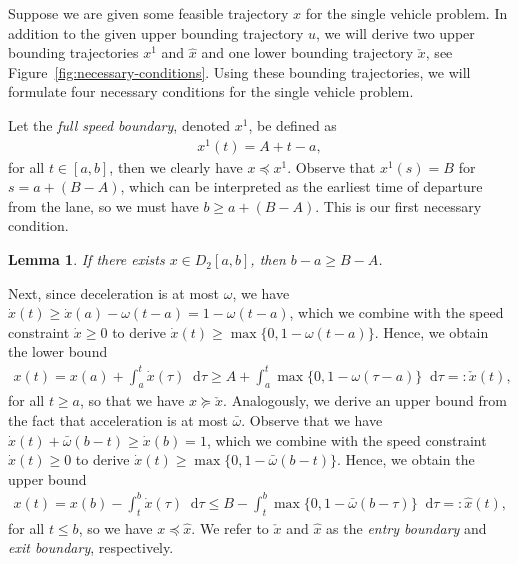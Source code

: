 \documentclass[a4paper]{report}
\theoremstyle{definition}
\theoremstyle{plain}
\newtheorem{lemma}{Lemma}[chapter]
\newcommand*\diff{\mathop{}\!\mathrm{d}}
\begin{document}
Suppose we are given some feasible trajectory $x$ for the single vehicle
problem.
%
In addition to the given upper bounding trajectory $u$, we will derive two
upper bounding trajectories $x^{1}$ and $\hat{x}$ and one lower bounding
trajectory $\check{x}$, see Figure~\ref{fig:necessary-conditions}.
%
Using these bounding trajectories, we will formulate four necessary conditions
for the single vehicle problem.

Let the \emph{full speed boundary}, denoted $x^{1}$, be defined as
\begin{align}
  x^{1}(t) = A + t - a,
\end{align}
for all $t \in [a, b]$, then we clearly have $x \preceq x^{1}$. Observe that
$x^{1}(s) = B$ for $s = a + (B-A)$, which can be interpreted as the earliest
time of departure from the lane, so we must have $b \geq a + (B-A)$. This is our
first necessary condition.
%
\begin{lemma}\label{lemma:travel-constraint}
  If there exists $x\in D_{2}[a,b]$, then $b-a \geq B-A$.
\end{lemma}

Next, since deceleration is at most $\omega$, we have
$\dot{x}(t) \geq \dot{x}(a) - \omega(t - a) = 1 - \omega(t - a)$, which we
combine with the speed constraint $\dot{x} \geq 0$ to derive
$\dot{x}(t) \geq \max\{0, 1 - \omega (t - a) \}$. Hence, we obtain the lower
bound
\begin{align}\label{eq:check-x}
  x(t) = x(a) + \int_{a}^{t} \dot{x}(\tau) \diff \tau \geq A + \int_{a}^{t} \max\{0, 1 - \omega (\tau - a) \} \diff \tau =: \check{x}(t) ,
\end{align}
for all $t \geq a$, so that we have $x \succeq \check{x}$.
%
Analogously, we derive an upper bound from the fact that acceleration is at most $\bar{\omega}$. Observe that we have
$\dot{x}(t) + \bar{\omega} (b - t) \geq \dot{x}(b) = 1$, which we combine
with the speed constraint $\dot{x}(t) \geq 0$ to derive
$\dot{x}(t) \geq \max \{ 0, 1 - \bar{\omega}(b - t) \}$. Hence, we obtain the
upper bound
\begin{align}\label{eq:hat-x}
  x(t) = x(b) - \int_{t}^{b} \dot{x}(\tau) \diff \tau
  \leq B - \int_{t}^{b} \max\{ 0, 1 -\bar{\omega} (b - \tau) \} \diff \tau =: \hat{x}(t) ,
\end{align}
for all $t \leq b$, so we have $x \preceq \hat{x}$.
%
We refer to $\check{x}$ and $\hat{x}$ as the \emph{entry boundary} and
\emph{exit boundary}, respectively.
\end{document}
